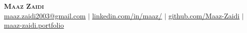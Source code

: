 \begin{center}
	\textbf{\Huge \scshape Maaz Zaidi} \\ \vspace{5pt}
    \href{maaz.zaidi2003@gmail.com}{\underline{maaz.zaidi2003@gmail.com}} $|$
	\href{https://www.linkedin.com/in/maaz-zaidi-5a08721b4/}{\underline{linkedin.com/in/maaz/}} $|$
	\href{https://github.com/Maaz-Zaidi}{\underline{github.com/Maaz-Zaidi}} $|$
    \href{https://maaz-zaidi.github.io/resume}{\underline{maaz-zaidi.portfolio}} 
\end{center}

